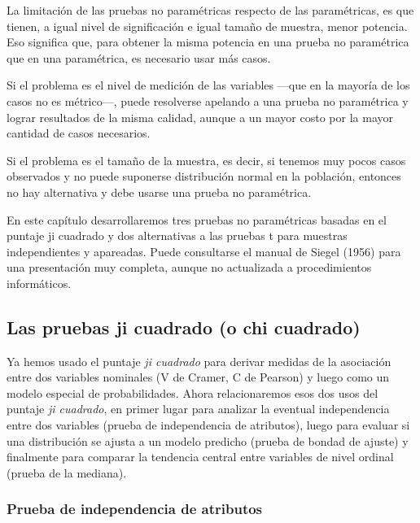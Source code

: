 \documentclass[]{book}
\begin{document}
La limitación de las pruebas no paramétricas respecto de las
paramétricas, es que tienen, a igual nivel de significación e igual
tamaño de muestra, menor potencia. Eso significa que, para obtener la
misma potencia en una prueba no paramétrica que en una paramétrica, es
necesario usar más casos.

Si el problema es el nivel de medición de las variables ---que en la
mayoría de los casos no es métrico---, puede resolverse apelando a una
prueba no paramétrica y lograr resultados de la misma calidad, aunque a
un mayor costo por la mayor cantidad de casos necesarios.

Si el problema es el tamaño de la muestra, es decir, si tenemos muy
pocos casos observados y no puede suponerse distribución normal en la
población, entonces no hay alternativa y debe usarse una prueba no
paramétrica.

En este capítulo desarrollaremos tres pruebas no paramétricas basadas en
el puntaje ji cuadrado y dos alternativas a las pruebas t para muestras
independientes y apareadas. Puede consultarse el manual de Siegel (1956)
para una presentación muy completa, aunque no actualizada a
procedimientos informáticos.

\hypertarget{las-pruebas-ji-cuadrado-o-chi-cuadrado}{%
\subsection{Las pruebas ji cuadrado (o chi cuadrado)}\label{las-pruebas-ji-cuadrado-o-chi-cuadrado}}

Ya hemos usado el puntaje \emph{ji cuadrado} para derivar medidas de la asociación
entre dos variables nominales (V de Cramer, C de Pearson) y luego como
un modelo especial de probabilidades. Ahora relacionaremos esos dos usos
del puntaje \emph{ji cuadrado}, en primer lugar para analizar la eventual
independencia entre dos variables (prueba de independencia de
atributos), luego para evaluar si una distribución se ajusta a un modelo
predicho (prueba de bondad de ajuste) y finalmente para comparar la
tendencia central entre variables de nivel ordinal (prueba de la
mediana).

\hypertarget{prueba-de-independencia-de-atributos}{%
\subsubsection{Prueba de independencia de atributos}\label{prueba-de-independencia-de-atributos}}
\end{document}
